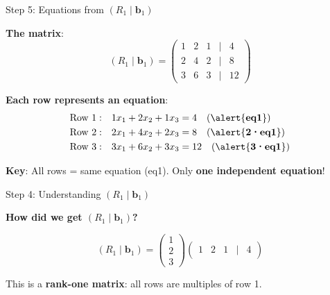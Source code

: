 \documentclass[10pt]{beamer}
\theoremstyle{definition}
\newcommand{\x}[1]{\alert{\textbf{#1}}}
\begin{document}
\begin{frame}{Step 5: Equations from $(R_1 \mid \mathbf{b}_1)$}

\x{The matrix}:
$$(R_1 \mid \mathbf{b}_1) = \begin{pmatrix}
1 & 2 & 1 & | & 4 \\
2 & 4 & 2 & | & 8 \\
3 & 6 & 3 & | & 12
\end{pmatrix}$$

\vspace{0.5em}

\x{Each row represents an equation}:
\begin{align*}
\text{Row 1}: &\quad 1x_1 + 2x_2 + 1x_3 = 4 \quad \text{(\x{eq1})} \\
\text{Row 2}: &\quad 2x_1 + 4x_2 + 2x_3 = 8 \quad \text{(\x{2·eq1})} \\
\text{Row 3}: &\quad 3x_1 + 6x_2 + 3x_3 = 12 \quad \text{(\x{3·eq1})}
\end{align*}

\x{Key}: All rows = same equation (eq1). Only \x{one independent equation}!

\end{frame}

\begin{frame}{Step 4: Understanding $(R_1 \mid \mathbf{b}_1)$}

\x{How did we get $(R_1 \mid \mathbf{b}_1)$?}

$$(R_1 \mid \mathbf{b}_1) = \begin{pmatrix} 1 \\ 2 \\ 3 \end{pmatrix} \begin{pmatrix} 1 & 2 & 1 & | & 4 \end{pmatrix}$$

\vspace{1em}

This is a \x{rank-one matrix}: all rows are multiples of row 1.

\end{frame}
\end{document}
